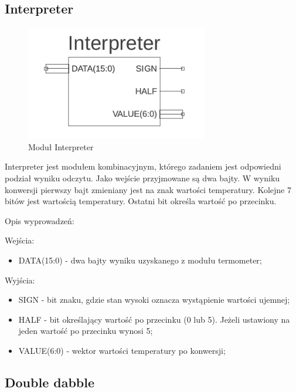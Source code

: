\documentclass[a4paper]{article}
\begin{document}
\subsection{Interpreter}

\begin{figure}[H]
\begin{center}
\includegraphics[height=5cm]{graphics/interpreter_sym.png}
\end{center}
\caption{Moduł Interpreter}
\label{interpreter_sym}
\end{figure}

Interpreter jest modułem kombinacyjnym, którego zadaniem jest odpowiedni podział wyniku odczytu. Jako wejście przyjmowane są dwa bajty. W wyniku konwersji pierwszy bajt zmieniany jest na znak wartości temperatury. Kolejne 7 bitów jest wartością temperatury. Ostatni bit określa wartość po przecinku. 

Opis wyprowadzeń:

Wejścia:
\begin{itemize}
\item DATA(15:0) - dwa bajty wyniku uzyskanego z modułu termometer;
\end{itemize}

Wyjścia:
\begin{itemize}
\item SIGN - bit znaku, gdzie stan wysoki oznacza wystąpienie wartości ujemnej;
\item HALF - bit określający wartość po przecinku (0 lub 5). Jeżeli ustawiony na jeden wartość po przecinku wynosi 5;
\item VALUE(6:0) - wektor wartości temperatury po konwersji;
\end{itemize}

\subsection{Double dabble}
\end{document}
